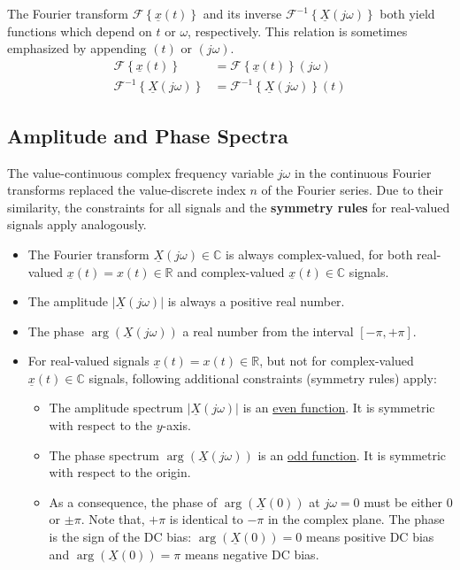 \begin{refsection}
The Fourier transform $\mathcal{F} \left\{\underline{x}(t)\right\}$ and its inverse $\mathcal{F}^{-1} \left\{\underline{X}(j \omega)\right\}$ both yield functions which depend on $t$ or $\omega$, respectively. This relation is sometimes emphasized by appending $(t)$ or $\left(j \omega\right)$.
\begin{subequations}
	\begin{align}
		\mathcal{F} \left\{\underline{x}(t)\right\} &= \mathcal{F} \left\{\underline{x}(t)\right\} \left(j \omega\right) \\
		\mathcal{F}^{-1} \left\{\underline{X}(j \omega)\right\} &= \mathcal{F}^{-1} \left\{\underline{X}(j \omega)\right\} (t)
	\end{align}
\end{subequations}

\subsection{Amplitude and Phase Spectra}

The value-continuous complex frequency variable $j \omega$ in the continuous Fourier transforms replaced the value-discrete index $n$ of the Fourier series. Due to their similarity, the constraints for all signals and the  \textbf{symmetry rules} for real-valued signals apply analogously.

\begin{itemize}
	\item The Fourier transform $\underline{X}(j \omega) \in \mathbb{C}$ is always complex-valued, for both real-valued $\underline{x}(t) = x(t) \in \mathbb{R}$ and complex-valued $\underline{x}(t) \in \mathbb{C}$ signals.
	\item The amplitude $|\underline{X}(j \omega)|$ is always a positive real number.
	\item The phase $\arg\left(\underline{X}(j \omega)\right)$ a real number from the interval $[-\pi, +\pi]$.
	\item For real-valued signals $\underline{x}(t) = x(t) \in \mathbb{R}$, but not for complex-valued $\underline{x}(t) \in \mathbb{C}$ signals, following additional constraints (symmetry rules) apply:
	\begin{itemize}
		\item The amplitude spectrum $|\underline{X}(j \omega)|$ is an \underline{even function}. It is symmetric with respect to the $y$-axis.
		\item The phase spectrum $\arg\left(\underline{X}(j \omega)\right)$ is an \underline{odd function}. It is symmetric with respect to the origin.
		\item As a consequence, the phase of $\arg\left(\underline{X}(0)\right)$ at $j \omega = 0$ must be either $0$ or $\pm \pi$. Note that, $+\pi$ is identical to $-\pi$ in the complex plane. The phase is the sign of the \ac{DC} bias: $\arg\left(\underline{X}(0)\right) = 0$ means positive \ac{DC} bias and $\arg\left(\underline{X}(0)\right) = \pi$ means negative \ac{DC} bias.
	\end{itemize}
\end{itemize}


\end{refsection}
